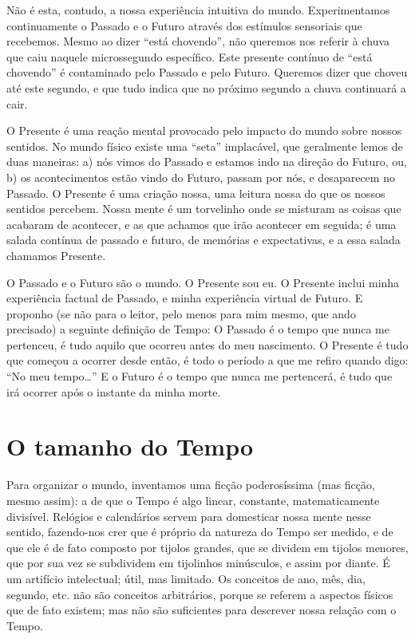 Não é esta, contudo, a nossa experiência intuitiva do mundo.
Experimentamos continuamente o Passado e o Futuro através dos
estímulos sensoriais que recebemos. Mesmo ao dizer “está chovendo”,
não queremos nos referir à chuva que caiu naquele microssegundo
específico. Este presente contínuo de “está chovendo” é contaminado
pelo Passado e pelo Futuro. Queremos dizer que choveu até este
segundo, e que tudo indica que no próximo segundo a chuva continuará
a cair. 

O Presente é uma reação mental provocado pelo impacto do mundo sobre
nossos sentidos. No mundo físico existe uma “seta” implacável, que
geralmente lemos de duas maneiras: a) nós vimos do Passado e estamos
indo na direção do Futuro, ou, b) os acontecimentos estão vindo do
Futuro, passam por nós, e desaparecem no Passado.  O Presente é uma
criação nossa, uma leitura nossa do que os nossos sentidos percebem. 
Nossa mente é um torvelinho onde se misturam as coisas que acabaram
de acontecer, e as que achamos que irão acontecer em seguida; é uma
salada contínua de passado e futuro, de memórias e expectativas, e a
essa salada chamamos Presente.

O Passado e o Futuro são o mundo. O Presente sou eu. O Presente inclui
minha experiência factual de Passado, e minha experiência virtual de
Futuro. E proponho (se não para o leitor, pelo menos para mim mesmo,
que ando precisado) a seguinte definição de Tempo: O Passado é o
tempo que nunca me pertenceu, é tudo aquilo que ocorreu antes do meu
nascimento. O Presente é tudo que começou a ocorrer desde então, é
todo o período a que me refiro quando digo: “No meu tempo…”  E o
Futuro é o tempo que nunca me pertencerá, é tudo que irá ocorrer após
o instante da minha morte.

\chapter{O tamanho do Tempo}

Para organizar o mundo, inventamos uma ficção poderosíssima (mas
ficção, mesmo assim): a de que o Tempo é algo linear, constante,
matematicamente divisível. Relógios e calendários servem para
domesticar nossa mente nesse sentido, fazendo-nos crer que é próprio
da natureza do Tempo ser medido, e de que ele é de fato composto por
tijolos grandes, que se dividem em tijolos menores, que por sua vez
se subdividem em tijolinhos minúsculos, e assim por diante.  É um
artifício intelectual; útil, mas limitado. Os conceitos de ano, mês,
dia, segundo, etc. não são conceitos arbitrários, porque se referem a
aspectos físicos que de fato existem; mas não são suficientes para
descrever nossa relação com o Tempo.


